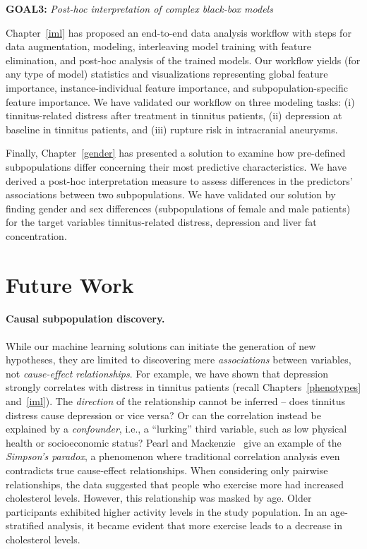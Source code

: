 \documentclass[
  oneside]{book}
\begin{document}
\textbf{GOAL3:} \emph{Post-hoc interpretation of complex black-box models}

Chapter~\ref{iml} has proposed an end-to-end data analysis workflow with steps for data augmentation, modeling, interleaving model training with feature elimination, and post-hoc analysis of the trained models.
Our workflow yields (for any type of model) statistics and visualizations representing global feature importance, instance-individual feature importance, and subpopulation-specific feature importance.
We have validated our workflow on three modeling tasks: (i) tinnitus-related distress after treatment in tinnitus patients, (ii) depression at baseline in tinnitus patients, and (iii) rupture risk in intracranial aneurysms.

Finally, Chapter~\ref{gender} has presented a solution to examine how pre-defined subpopulations differ concerning their most predictive characteristics.
We have derived a post-hoc interpretation measure to assess differences in the predictors' associations between two subpopulations.
We have validated our solution by finding gender and sex differences (subpopulations of female and male patients) for the target variables tinnitus-related distress, depression and liver fat concentration.

\hypertarget{conclusion-future-work}{%
\section{Future Work}\label{conclusion-future-work}}

\paragraph*{Causal subpopulation discovery.}

While our machine learning solutions can initiate the generation of new hypotheses,
they are limited to discovering mere \emph{associations} between variables, not \emph{cause-effect relationships}.
For example, we have shown that depression strongly correlates with distress in tinnitus patients (recall Chapters~\ref{phenotypes} and~\ref{iml}).
The \emph{direction} of the relationship cannot be inferred -- does tinnitus distress cause depression or vice versa?
Or can the correlation instead be explained by a \emph{confounder}, i.e., a ``lurking'' third variable, such as low physical health or socioeconomic status?
Pearl and Mackenzie~\autocite{Pearl:BookOfWhy2018} give an example of the \emph{Simpson's paradox}, a phenomenon where traditional correlation analysis even contradicts true cause-effect relationships.
When considering only pairwise relationships, the data suggested that people who exercise more had increased cholesterol levels.
However, this relationship was masked by age.
Older participants exhibited higher activity levels in the study population.
In an age-stratified analysis, it became evident that more exercise leads to a decrease in cholesterol levels.
\end{document}
